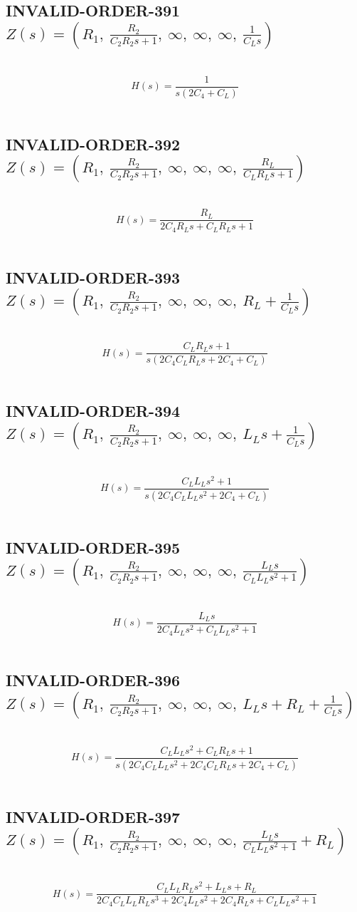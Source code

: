 \documentclass{article}
\begin{document}
\subsection{INVALID-ORDER-391 $Z(s) = \left( R_{1}, \  \frac{R_{2}}{C_{2} R_{2} s + 1}, \  \infty, \  \infty, \  \infty, \  \frac{1}{C_{L} s}\right)$ } \ 
\textbf{\[H(s) = \frac{1}{s \left(2 C_{4} + C_{L}\right)}\] } \ 
\subsection{INVALID-ORDER-392 $Z(s) = \left( R_{1}, \  \frac{R_{2}}{C_{2} R_{2} s + 1}, \  \infty, \  \infty, \  \infty, \  \frac{R_{L}}{C_{L} R_{L} s + 1}\right)$ } \ 
\textbf{\[H(s) = \frac{R_{L}}{2 C_{4} R_{L} s + C_{L} R_{L} s + 1}\] } \ 
\subsection{INVALID-ORDER-393 $Z(s) = \left( R_{1}, \  \frac{R_{2}}{C_{2} R_{2} s + 1}, \  \infty, \  \infty, \  \infty, \  R_{L} + \frac{1}{C_{L} s}\right)$ } \ 
\textbf{\[H(s) = \frac{C_{L} R_{L} s + 1}{s \left(2 C_{4} C_{L} R_{L} s + 2 C_{4} + C_{L}\right)}\] } \ 
\subsection{INVALID-ORDER-394 $Z(s) = \left( R_{1}, \  \frac{R_{2}}{C_{2} R_{2} s + 1}, \  \infty, \  \infty, \  \infty, \  L_{L} s + \frac{1}{C_{L} s}\right)$ } \ 
\textbf{\[H(s) = \frac{C_{L} L_{L} s^{2} + 1}{s \left(2 C_{4} C_{L} L_{L} s^{2} + 2 C_{4} + C_{L}\right)}\] } \ 
\subsection{INVALID-ORDER-395 $Z(s) = \left( R_{1}, \  \frac{R_{2}}{C_{2} R_{2} s + 1}, \  \infty, \  \infty, \  \infty, \  \frac{L_{L} s}{C_{L} L_{L} s^{2} + 1}\right)$ } \ 
\textbf{\[H(s) = \frac{L_{L} s}{2 C_{4} L_{L} s^{2} + C_{L} L_{L} s^{2} + 1}\] } \ 
\subsection{INVALID-ORDER-396 $Z(s) = \left( R_{1}, \  \frac{R_{2}}{C_{2} R_{2} s + 1}, \  \infty, \  \infty, \  \infty, \  L_{L} s + R_{L} + \frac{1}{C_{L} s}\right)$ } \ 
\textbf{\[H(s) = \frac{C_{L} L_{L} s^{2} + C_{L} R_{L} s + 1}{s \left(2 C_{4} C_{L} L_{L} s^{2} + 2 C_{4} C_{L} R_{L} s + 2 C_{4} + C_{L}\right)}\] } \ 
\subsection{INVALID-ORDER-397 $Z(s) = \left( R_{1}, \  \frac{R_{2}}{C_{2} R_{2} s + 1}, \  \infty, \  \infty, \  \infty, \  \frac{L_{L} s}{C_{L} L_{L} s^{2} + 1} + R_{L}\right)$ } \ 
\textbf{\[H(s) = \frac{C_{L} L_{L} R_{L} s^{2} + L_{L} s + R_{L}}{2 C_{4} C_{L} L_{L} R_{L} s^{3} + 2 C_{4} L_{L} s^{2} + 2 C_{4} R_{L} s + C_{L} L_{L} s^{2} + 1}\] } \ 
\end{document}
